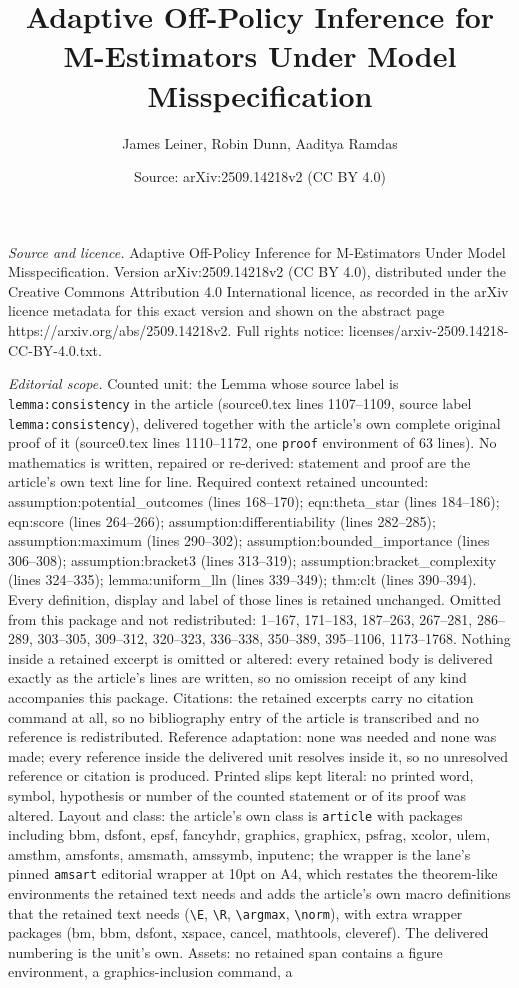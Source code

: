 \documentclass[10pt,a4paper]{amsart}
\title[Adaptive Off-Policy Inference for M-Estimators Under Model M]{Adaptive Off-Policy Inference for M-Estimators Under Model Misspecification}
\author{James Leiner, Robin Dunn, Aaditya Ramdas}
\date{Source: arXiv:2509.14218v2 (CC BY 4.0)}
\begin{document}
\maketitle

\noindent\emph{Source and licence.} Adaptive Off-Policy Inference for M-Estimators Under Model Misspecification. Version arXiv:2509.14218v2 (CC BY 4.0), distributed under the Creative Commons Attribution 4.0 International licence, as recorded in the arXiv licence metadata for this exact version and shown on the abstract page https://arxiv.org/abs/2509.14218v2. Full rights notice: licenses/arxiv-2509.14218-CC-BY-4.0.txt.\par\smallskip

\noindent\textit{Editorial scope.} Counted unit: the Lemma whose source label is \texttt{lemma:consistency} in the article (source0.tex lines 1107--1109, source label \texttt{lemma:consistency}), delivered together with the article's own complete original proof of it (source0.tex lines 1110--1172, one \texttt{proof} environment of 63 lines). No mathematics is written, repaired or re-derived: statement and proof are the article's own text line for line. Required context retained uncounted: assumption:potential\_outcomes (lines 168--170); eqn:theta\_star (lines 184--186); eqn:score (lines 264--266); assumption:differentiability (lines 282--285); assumption:maximum (lines 290--302); assumption:bounded\_importance (lines 306--308); assumption:bracket3 (lines 313--319); assumption:bracket\_complexity (lines 324--335); lemma:uniform\_lln (lines 339--349); thm:clt (lines 390--394). Every definition, display and label of those lines is retained unchanged. Omitted from this package and not redistributed: 1--167, 171--183, 187--263, 267--281, 286--289, 303--305, 309--312, 320--323, 336--338, 350--389, 395--1106, 1173--1768. Nothing inside a retained excerpt is omitted or altered: every retained body is delivered exactly as the article's lines are written, so no omission receipt of any kind accompanies this package. Citations: the retained excerpts carry no citation command at all, so no bibliography entry of the article is transcribed and no reference is redistributed. Reference adaptation: none was needed and none was made; every reference inside the delivered unit resolves inside it, so no unresolved reference or citation is produced. Printed slips kept literal: no printed word, symbol, hypothesis or number of the counted statement or of its proof was altered. Layout and class: the article's own class is \texttt{article} with packages including bbm, dsfont, epsf, fancyhdr, graphics, graphicx, psfrag, xcolor, ulem, amsthm, amsfonts, amsmath, amssymb, inputenc; the wrapper is the lane's pinned \texttt{amsart} editorial wrapper at 10pt on A4, which restates the theorem-like environments the retained text needs and adds the article's own macro definitions that the retained text needs (\texttt{\textbackslash E}, \texttt{\textbackslash R}, \texttt{\textbackslash argmax}, \texttt{\textbackslash norm}), with extra wrapper packages (bm, bbm, dsfont, xspace, cancel, mathtools, cleveref). The delivered numbering is the unit's own. Assets: no retained span contains a figure environment, a graphics-inclusion command, a 
\end{document}
